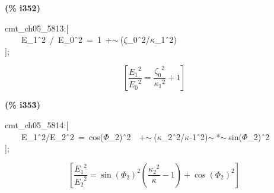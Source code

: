 \documentclass[fleqn]{article}
\begin{document}
\noindent
\begin{minipage}[t]{4.000000em}\color{red}\bfseries
(\% i352)	
\end{minipage}
\begin{minipage}[t]{\textwidth}\color{blue}
cmt\_ch05\_5813:[\\
\ \ \ \ E\_1\^\ 2\ /\ E\_0\^\ 2\ =\ 1\ +\ensuremath{\sim\ }(\ensuremath{\zeta}\_0\^\ 2/\ensuremath{\kappa}\_1\^\ 2)\\
];
\end{minipage}
\[\displaystyle \tag{\% o352} 
\left[ \frac{{{{E_1}}^{2}}}{{{{E_0}}^{2}}}=\frac{{{{{\zeta }_0}}^{2}}}{{{{{\kappa }_1}}^{2}}}+1\right] \mbox{}
\]


\noindent
\begin{minipage}[t]{4.000000em}\color{red}\bfseries
(\% i353)	
\end{minipage}
\begin{minipage}[t]{\textwidth}\color{blue}
cmt\_ch05\_5814:[\\
\ \ \ \ E\_1\^\ 2/E\_2\^\ 2\ =\ cos(\ensuremath{\Phi}\_2)\^\ 2\ \ +\ensuremath{\sim\ }(\ensuremath{\kappa}\_2\^\ 2/\ensuremath{\kappa}-1\^\ 2)\ensuremath{\sim\ }*\ensuremath{\sim\ }sin(\ensuremath{\Phi}\_2)\^\ 2\\
];
\end{minipage}
\[\displaystyle \tag{\% o353} 
\left[ \frac{{{{E_1}}^{2}}}{{{{E_2}}^{2}}}={{\sin{\left( {{\Phi }_2}\right) }}^{2}} \left( \frac{{{{{\kappa }_2}}^{2}}}{\kappa }-1\right) +{{\cos{\left( {{\Phi }_2}\right) }}^{2}}\right] \mbox{}
\]
\end{document}
